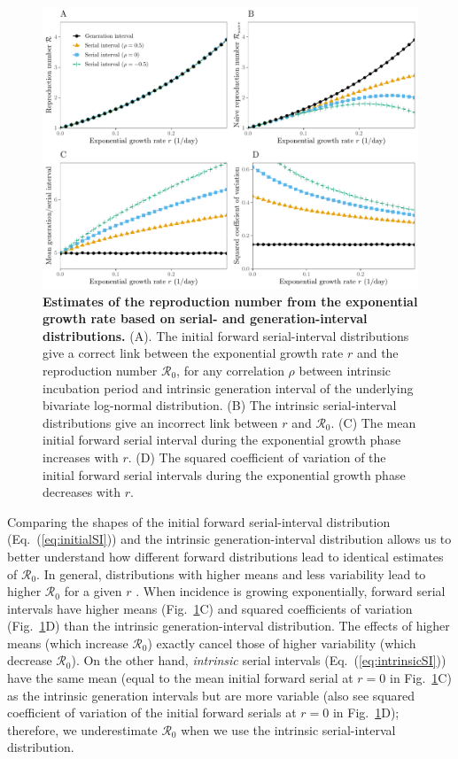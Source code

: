 \documentclass[12pt]{article}
\newcommand{\eref}[1]{Eq.~(\ref{eq:#1})}
\newcommand{\fref}[1]{Fig.~\ref{fig:#1}}
\newcommand{\Rx}[1]{\ensuremath{{\mathcal R}_{#1}}\xspace}
\newcommand{\Ro}{\Rx{0}}
\begin{document}
\begin{figure}[!th]
\includegraphics[width=\textwidth]{rR.pdf}
\caption{
\textbf{Estimates of the reproduction number from the exponential growth rate based on serial- and generation-interval distributions.}
(A). The initial forward serial-interval distributions give a correct
link between the exponential growth rate $r$ and the reproduction
number \Ro,
for any correlation $\rho$ between intrinsic incubation period and
intrinsic generation interval of the underlying bivariate log-normal distribution.
(B) The intrinsic serial-interval distributions give an incorrect link between $r$ and \Ro.
(C) The mean initial forward serial interval during the exponential growth phase increases with $r$.
(D) The squared coefficient of variation of the initial forward serial intervals during the exponential growth phase decreases with $r$.
}
\label{fig:rR}
\end{figure}

Comparing the shapes of the initial forward serial-interval distribution (\eref{initialSI}) and the intrinsic generation-interval distribution allows us to better understand how different forward distributions lead to identical estimates of \Ro.
In general, distributions with higher means and less variability lead to higher \Ro for a given $r$ \citep{wallinga2007generation, weitz2015modeling, park2019practical}.
When incidence is growing exponentially, forward serial intervals have higher means (\fref{rR}C) and squared coefficients of variation (\fref{rR}D) than the intrinsic generation-interval distribution.
The effects of higher means (which increase \Ro) exactly cancel those of higher variability (which decrease \Ro).
On the other hand, \emph{intrinsic} serial intervals (\eref{intrinsicSI}) have the same mean (equal to the mean initial forward serial at $r=0$ in \fref{rR}C) as the intrinsic generation intervals but are more variable (also see squared coefficient of variation of the initial forward serials at $r=0$ in \fref{rR}D); 
therefore, we underestimate \Ro when we use the intrinsic serial-interval distribution.
\end{document}
